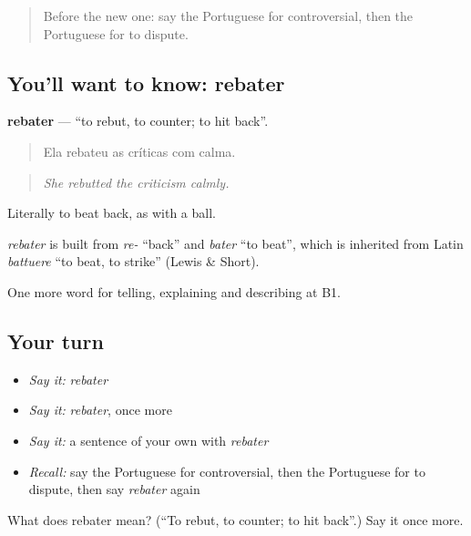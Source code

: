 \begin{quote}
Before the new one: say the Portuguese for controversial, then the Portuguese for to dispute.
\end{quote}

\subsection*{You'll want to know: rebater}
\textbf{rebater} — \textquotedblleft{}to rebut, to counter; to hit back\textquotedblright{}.

\begin{quote}
Ela rebateu as críticas com calma.
\end{quote}

\begin{quote}
\emph{She rebutted the criticism calmly.}
\end{quote}

Literally to beat back, as with a ball.

\begin{cousinweb}
\emph{rebater} is built from \emph{re-} \textquotedblleft{}back\textquotedblright{} and \emph{bater} \textquotedblleft{}to beat\textquotedblright{}, which is inherited from Latin \emph{battuere} \textquotedblleft{}to beat, to strike\textquotedblright{} (Lewis \& Short).
\end{cousinweb}

\begin{grammarlens}[title={What you've built}]
One more word for telling, explaining and describing at B1.
\end{grammarlens}

\subsection*{Your turn}
\begin{itemize}
\raggedright
  \item \emph{Say it:} \emph{rebater}
  \item \emph{Say it:} \emph{rebater}, once more
  \item \emph{Say it:} a sentence of your own with \emph{rebater}
  \item \emph{Recall:} say the Portuguese for controversial, then the Portuguese for to dispute, then say \emph{rebater} again
\end{itemize}

\begin{tcolorbox}[breakable,colback=teal!4,colframe=teal!35!black,title={Before you move on}]
What does rebater mean? (\textquotedblleft{}To rebut, to counter; to hit back\textquotedblright{}.) Say it once more.
\end{tcolorbox}
